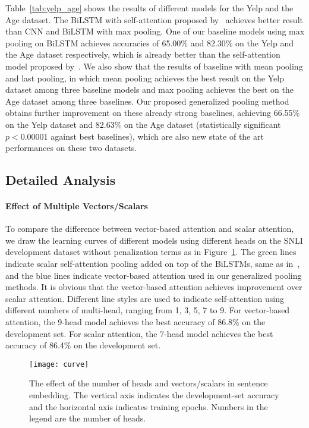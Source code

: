 \documentclass[11pt]{article}
\begin{document}
Table~\ref{tab:yelp_age} shows the results of different models for the Yelp and the Age dataset. The BiLSTM with self-attention proposed by~ achieves better result than CNN and BiLSTM with max pooling. One of our baseline models using max pooling on BiLSTM achieves accuracies of 65.00\% and 82.30\% on the Yelp and the Age dataset respectively, which is already better than the self-attention model proposed by~. We also show that the results of baseline with mean pooling and last pooling, in which mean pooling achieves the best result on the Yelp dataset among three baseline models and max pooling achieves the best on the Age dataset among three baselines. Our proposed generalized pooling method obtains further improvement on these already strong baselines, achieving 66.55\% on the Yelp dataset and 82.63\% on the Age dataset (statistically significant $p < 0.00001$ against best baselines), which are also new state of the art performances on these two datasets. 

\subsection{Detailed Analysis}

\paragraph{Effect of Multiple Vectors/Scalars}
To compare the difference between vector-based attention and scalar attention, we draw the learning curves of different models using different heads on the SNLI development dataset without penalization terms as in Figure~\ref{fig:curve}. The green lines indicate scalar self-attention pooling added on top of the BiLSTMs, same as in~, and the blue lines indicate vector-based attention used in our generalized pooling methods. It is obvious that the vector-based attention achieves improvement over scalar attention. Different line styles are used to indicate self-attention using different numbers of multi-head, ranging from 1, 3, 5, 7 to 9. For vector-based attention, the 9-head model achieves the best accuracy of 86.8\% on the development set. For scalar attention, the 7-head model achieves the best accuracy of 86.4\% on the development set.

\begin{figure}[!htb]
	\centering
	\texttt{[image: curve]}
	\caption{The effect of the number of heads and vectors/scalars in sentence embedding. The vertical axis indicates the development-set accuracy and the horizontal axis indicates training epochs. Numbers in the legend are the number of heads.}
	\label{fig:curve}
\end{figure}
\end{document}
